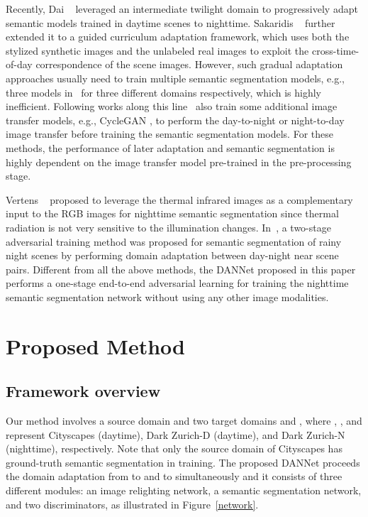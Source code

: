 \documentclass[final]{cvpr}
\begin{document}
\vspace{0.1cm}
\hspace{0.2cm}
Recently, Dai \etal~\cite{dai2018dark} leveraged an intermediate twilight domain to progressively adapt semantic models trained in daytime scenes to nighttime. 
Sakaridis \etal~\cite{sakaridis2019guided,sakaridis2020map} further extended it to a guided curriculum adaptation framework, which uses both the stylized synthetic images and the unlabeled real images to exploit the cross-time-of-day correspondence of the scene images. 
However, such gradual adaptation approaches usually need to train multiple semantic segmentation models, e.g., three models in~\cite{sakaridis2019guided} for three different domains respectively, 
which is highly inefficient.  
Following works along this line~\cite{romera2019bridging,sun2019see,nag2019s} also train some additional image transfer models, e.g., CycleGAN \cite{zhu2017unpaired}, to perform the day-to-night or night-to-day image transfer before training the semantic segmentation models. 
For these methods, the performance of later adaptation and semantic segmentation is highly dependent on the image transfer model pre-trained in the pre-processing stage.

Vertens \etal~\cite{vertens2020heatnet} proposed to leverage the thermal infrared images as a complementary input to the RGB images for nighttime semantic segmentation since thermal radiation is not very sensitive to the illumination changes. 
In~\cite{di2020rainy}, a two-stage adversarial training method was proposed  for  semantic segmentation of rainy night scenes by performing domain adaptation between day-night near scene pairs. 
Different from all the above methods, the DANNet proposed  in this paper performs a one-stage end-to-end adversarial learning for training the nighttime semantic segmentation network without using any other image modalities.


\section{Proposed Method}
\subsection{Framework overview}
Our method involves a source domain  and two target domains  and , where , , and  represent Cityscapes (daytime), Dark Zurich-D (daytime), and Dark Zurich-N (nighttime), respectively. 
Note that only the source domain  of Cityscapes has ground-truth semantic segmentation in training. 
The proposed DANNet proceeds the domain adaptation from  to  and  to  simultaneously and it consists of three different modules: an 
image relighting network, a semantic segmentation network, and two discriminators, as illustrated in Figure~\ref{network}.
\end{document}
